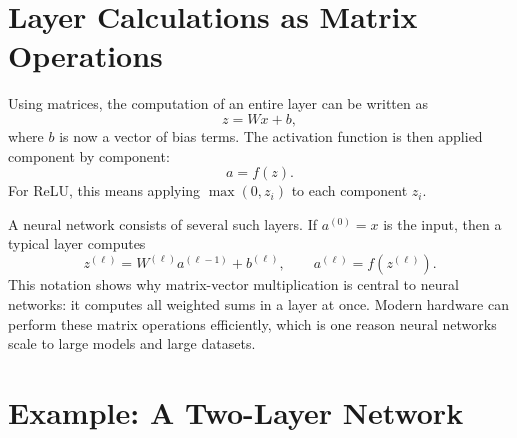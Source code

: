 \documentclass[11pt,openany,oneside]{book}
\begin{document}
\section{Layer Calculations as Matrix Operations}

Using matrices, the computation of an entire layer can be written as
\[
    z = Wx + b,
\]
where $b$ is now a vector of bias terms. The activation function is then applied
component by component:
\[
    a = f(z).
\]
For ReLU, this means applying $\max(0,z_i)$ to each component $z_i$.

A neural network consists of several such layers. If $a^{(0)} = x$ is the input,
then a typical layer computes
\[
    z^{(\ell)} = W^{(\ell)}a^{(\ell-1)} + b^{(\ell)}, \qquad
    a^{(\ell)} = f(z^{(\ell)}).
\]
This notation shows why matrix-vector multiplication is central to neural
networks: it computes all weighted sums in a layer at once. Modern hardware can
perform these matrix operations efficiently, which is one reason neural networks
scale to large models and large datasets.

\section{Example: A Two-Layer Network}
\end{document}
